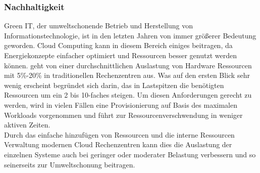 \subsubsection{Nachhaltigkeit}\label{nachhaltigkeit}
Green IT, der umweltschonende Betrieb und Herstellung von Informationstechnologie, ist in den letzten Jahren von immer größerer Bedeutung geworden. Cloud Computing kann in diesem Bereich einiges beitragen, da Energiekonzepte einfacher optimiert und Ressourcen besser genutzt werden können. \citeauthor*{Siegele.2008} geht von einer durchschnittlichen Auslastung von Hardware Ressourcen mit 5\%-20\% in traditionellen Rechenzentren aus. Was auf den ersten Blick sehr wenig erscheint begründet sich darin, das in Lastspitzen die benötigten Ressourcen um ein 2 bis 10-faches steigen. Um diesen Anforderungen gerecht zu werden, wird in vielen Fällen eine Provisionierung auf Basis des maximalen Workloads vorgenommen und führt zur Ressourcenverschwendung in weniger aktiven Zeiten.\\
Durch das einfache hinzufügen von Ressourcen und die interne Ressourcen Verwaltung modernen Cloud Rechenzentren kann dies die Auslastung der einzelnen Systeme auch bei geringer oder moderater Belastung verbessern und so seinerseits zur Umweltschonung beitragen. 

